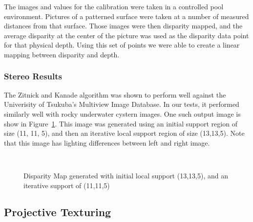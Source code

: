 \documentclass[a4paper,twoside]{article}
\begin{document}
The images and values for the calibration were taken in a controlled pool environment.  
Pictures of a patterned surface were taken at a number of measured distances from that surface. 
Those images were then disparity mapped, and the average disparity at the center of the picture was used as the disparity data point for that physical depth.
Using this set of points we were able to create a linear mapping between disparity and depth.

\subsubsection{Stereo Results}

The Zitnick and Kanade algorithm was shown to perform well against the Univerisity of Tsukuba's Multiview Image Database.  
In our tests, it performed similarly well with rocky underwater cystern images.  
One such output image is show in Figure~\ref{fig:disparity}.
This image was generated using an initial support region of size (11, 11, 5), and then an iterative local support region of size (13,13,5).
Note that this image has lighting differences between left and right image.

\begin{figure}[!h]
	\centering
		\quad %
		\\%
		\medskip
		\caption{Disparity Map generated with initial local support (13,13,5), and an iterative support of (11,11,5)}
		\label{fig:disparity}
\end{figure}

\subsection{Projective Texturing}


\end{document}
